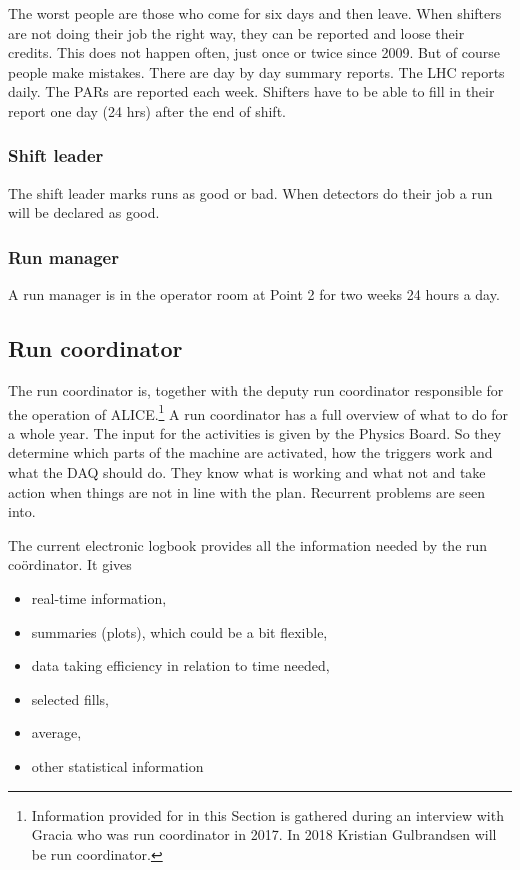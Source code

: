 The worst people are those who come for six days and then leave. When shifters are not doing their job the right way, they can be reported and loose their credits. This does not happen often, just once or twice since 2009. But of course people make mistakes. There are day by day summary reports. The LHC reports daily. The PARs are reported each week. Shifters have to be able to fill in their report one day (24 hrs) after the end of shift.

\subsubsection{Shift leader}
The shift leader marks runs as good or bad. When detectors do their job a run will be declared as good. 

\subsubsection{Run manager}
A run manager is in the operator room at Point 2 for two weeks 24 hours a day.

\subsection{Run coordinator}
The run coordinator is, together with the deputy run coordinator responsible for the operation of ALICE.\footnote{Information provided for in this Section is gathered during an interview with Gracia who was run coordinator in 2017. In 2018 Kristian Gulbrandsen will be run coordinator.} A run coordinator has a full overview of what to do for a whole year. The input for the activities is given by the Physics Board. So they determine which parts of the machine are activated, how the triggers work and what the DAQ should do. They know what is working and what not and take action when things are not in line with the plan. Recurrent problems are seen into. 

The current electronic logbook provides all the information needed by the run co\"ordinator. It gives
\begin{itemize}
  \item real-time information, 
  \item summaries (plots), which could be a bit flexible,
  \item data taking efficiency in relation to time needed,
  \item selected fills,
  \item average,
  \item other statistical information
\end{itemize}
 
